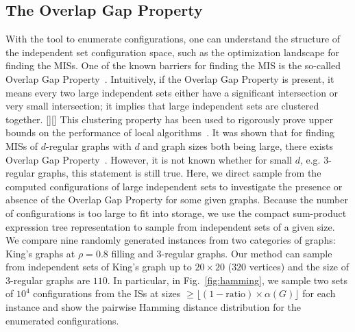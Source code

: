 \documentclass[onefignum, onetabnum]{siamart190516}
\newcommand{\<}{\langle}
\renewcommand{\>}{\rangle}
\newcommand{\Fig}[1]{Fig.~\ref{#1}}
\newcommand{\blue}[1]{[{\bf  \color{blue}{JG: #1}}]}
\newcommand{\purple}[1]{[{\bf  \color{purple}{MC: #1}}]}
\begin{document}
\subsection{The Overlap Gap Property\label{sec:overlap-gap}}
With the tool to enumerate configurations, one can %
understand the structure of the independent set configuration space,
such as the optimization landscape for finding the MISs.
One of the known barriers for finding the MIS is the so-called Overlap Gap Property~\cite{Gamarnik2013, Gamarnik2019}.
Intuitively, if the Overlap Gap Property is present, it means every two large independent sets either have a significant intersection or very small intersection;
it implies that large independent sets are clustered together. \purple{Do you want me to write a more formal definition as well or do you think it's not necessary?}\blue{I suppose you want to justify the origin of ``ratio'', then it would great if you can explain it more clearly. However, explaining the concept overlap gap property well seems to be impossible in a this paper (you need at least some plots).}
This clustering property has been used to rigorously prove upper bounds on the performance of local algorithms~\cite{Gamarnik2013, Gamarnik2019}.
It was shown that for finding MISs of $d$-regular graphs with $d$ and graph sizes both being large, there exists Overlap Gap Property~\cite{Rahman2017,Gamarnik2021}.
However, it is not known whether for small $d$, e.g. $3$- regular graphs, this statement is still true.
Here, we direct sample from the computed configurations of large independent sets to investigate the presence or absence of the Overlap Gap Property for some given graphs.
Because the number of configurations is too large to fit into storage, we use the compact sum-product expression tree representation to sample from independent sets of a given size. 
We compare  nine randomly generated instances from two categories of graphs: King's graphs at $\rho = 0.8$ filling and $3$-regular graphs.%
Our method can sample from independent sets of King's graph up to $20\times 20$ ($320$ vertices) and the size of $3$-regular graphs are $110$.
In particular, in \Fig{fig:hamming}, 
we sample two sets of $10^4$ configurations from the ISs at sizes $\geq \lfloor (1-\text{ratio}) \times \alpha(G)\rfloor$ for each instance
 and show the pairwise Hamming distance distribution for the enumerated configurations.
\end{document}

